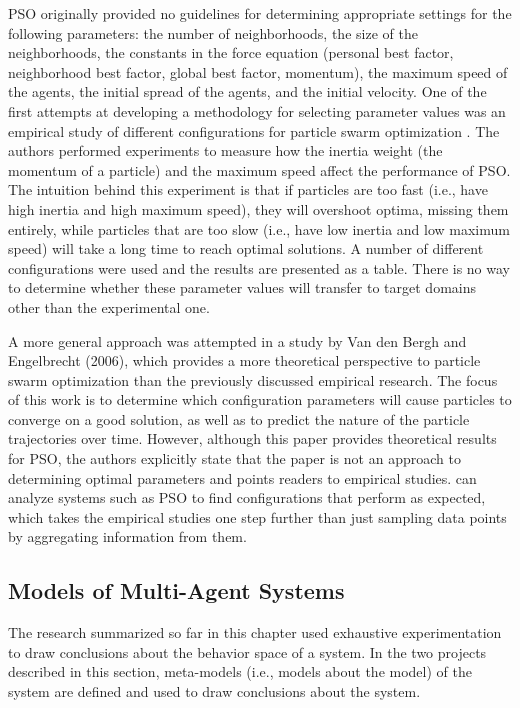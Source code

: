 PSO originally provided no guidelines for determining appropriate settings for the following parameters: the number of neighborhoods, the size of the neighborhoods, the constants in the force equation (personal best factor, neighborhood best factor, global best factor, momentum), the maximum speed of the agents, the initial spread of the agents, and the initial velocity.
One of the first attempts at developing a methodology for selecting parameter values was an empirical study of different configurations for particle swarm optimization \cite{shi1998parameter}.
The authors performed experiments to measure how the inertia weight (the momentum of a particle) and the maximum speed affect the performance of PSO.
The intuition behind this experiment is that if particles are too fast (i.e., have high inertia and high maximum speed), they will overshoot optima, missing them entirely, while particles that are too slow (i.e., have low inertia and low maximum speed) will take a long time to reach optimal solutions.
A number of different configurations were used and the results are presented as a table.
There is no way to determine whether these parameter values will transfer to target domains other than the experimental one.

A more general approach was attempted in a study by Van den Bergh and Engelbrecht (2006)\nocite{van2006study}, which provides a more theoretical perspective to particle swarm optimization than the previously discussed empirical research.
The focus of this work is to determine which configuration parameters will cause particles to converge on a good solution, as well as to predict the nature of the particle trajectories over time.
However, although this paper provides theoretical results for PSO, the authors explicitly state that the paper is not an approach to determining optimal parameters and points readers to empirical studies.
\fw can analyze systems such as PSO to find configurations that perform as expected, which takes the empirical studies one step further than just sampling data points by aggregating information from them.

\subsection{Models of Multi-Agent Systems}

The research summarized so far in this chapter used exhaustive experimentation to draw conclusions about the behavior space of a system.
In the two projects described in this section, meta-models (i.e., models about the model) of the system are defined and used to draw conclusions about the system.

